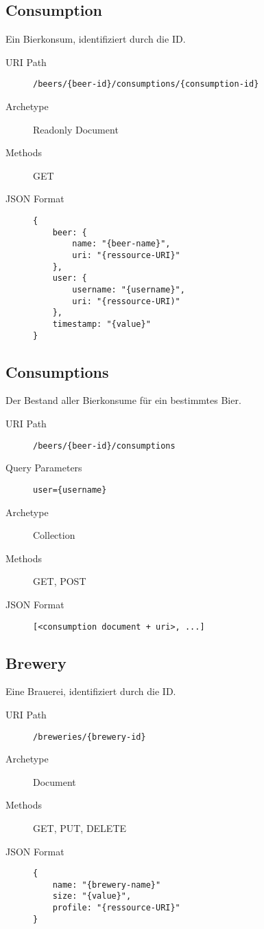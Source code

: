 \documentclass[10pt,a4paper]{scrartcl}
\begin{document}
\subsection{Consumption}

Ein Bierkonsum, identifiziert durch die ID.

\begin{description}
	\item[URI Path] \texttt{/beers/\{beer-id\}/consumptions/\{consumption-id\}}
	\item[Archetype] Readonly Document
	\item[Methods] GET
	\item[JSON Format] \hfill
\begin{lstlisting}
{
	beer: {
		name: "{beer-name}",
		uri: "{ressource-URI}"
	},
	user: {
		username: "{username}",
		uri: "{ressource-URI)"
	},
	timestamp: "{value}"
}
\end{lstlisting}
\end{description}


\subsection{Consumptions}

Der Bestand aller Bierkonsume für ein bestimmtes Bier.

\begin{description}
	\item[URI Path] \texttt{/beers/\{beer-id\}/consumptions}
 	\item[Query Parameters] \texttt{user=\{username\}}
	\item[Archetype] Collection
	\item[Methods] GET, POST
	\item[JSON Format] \hfill
\begin{lstlisting}
[<consumption document + uri>, ...]
\end{lstlisting}
\end{description}


\subsection{Brewery}

Eine Brauerei, identifiziert durch die ID.

\begin{description}
	\item[URI Path] \texttt{/breweries/\{brewery-id\}}
	\item[Archetype] Document
	\item[Methods] GET, PUT, DELETE
	\item[JSON Format] \hfill
\begin{lstlisting}
{	
	name: "{brewery-name}"
	size: "{value}",
	profile: "{ressource-URI}"
}
\end{lstlisting}
\end{description}
\end{document}
